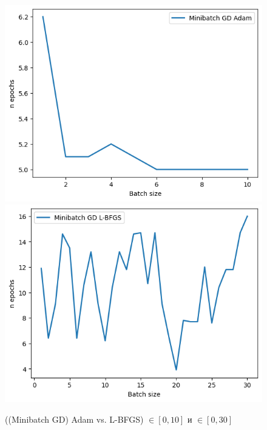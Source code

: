 \documentclass[12pt, a4paper, oneside, final]{article}
\begin{document}
	\begin{figure}[H]
		\centering
		\includegraphics[scale = 0.75]{Image/T2_ADAM_1_10.png}
		\includegraphics[scale = 0.75]{Image/AT_LBFGS_0_30.png}
		\caption*{((Minibatch GD) Adam vs. L-BFGS) $\in [0, 10]$ и $\in [0, 30]$}
	\end{figure}
\end{document}
